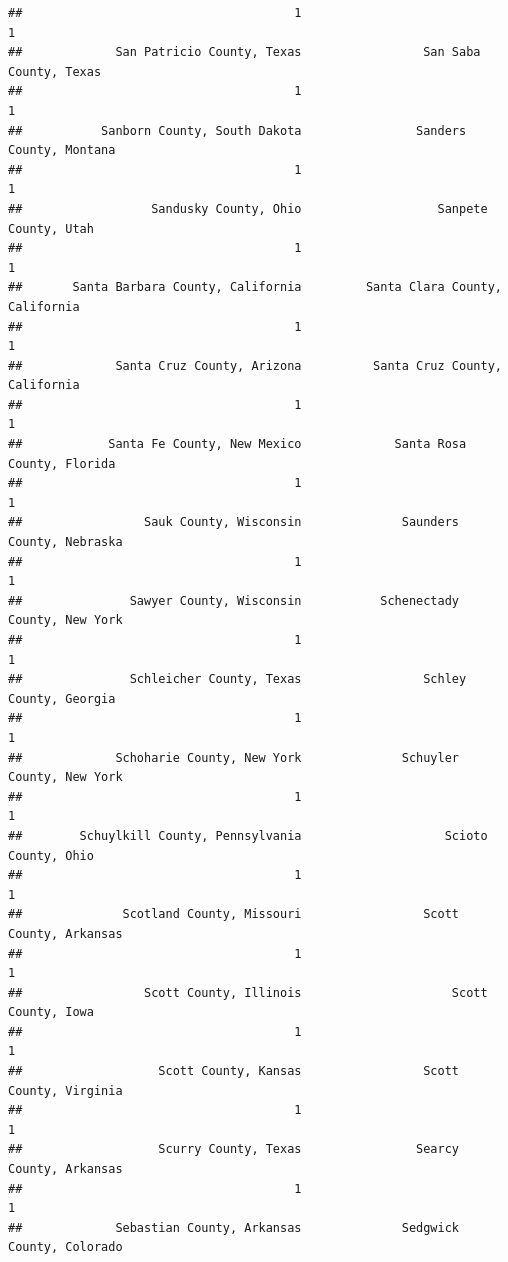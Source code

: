 \documentclass[
]{article}
\begin{document}
\begin{verbatim}
##                                      1                                      1 
##             San Patricio County, Texas                 San Saba County, Texas 
##                                      1                                      1 
##           Sanborn County, South Dakota                Sanders County, Montana 
##                                      1                                      1 
##                  Sandusky County, Ohio                   Sanpete County, Utah 
##                                      1                                      1 
##       Santa Barbara County, California         Santa Clara County, California 
##                                      1                                      1 
##             Santa Cruz County, Arizona          Santa Cruz County, California 
##                                      1                                      1 
##            Santa Fe County, New Mexico             Santa Rosa County, Florida 
##                                      1                                      1 
##                 Sauk County, Wisconsin              Saunders County, Nebraska 
##                                      1                                      1 
##               Sawyer County, Wisconsin           Schenectady County, New York 
##                                      1                                      1 
##               Schleicher County, Texas                 Schley County, Georgia 
##                                      1                                      1 
##             Schoharie County, New York              Schuyler County, New York 
##                                      1                                      1 
##        Schuylkill County, Pennsylvania                    Scioto County, Ohio 
##                                      1                                      1 
##              Scotland County, Missouri                 Scott County, Arkansas 
##                                      1                                      1 
##                 Scott County, Illinois                     Scott County, Iowa 
##                                      1                                      1 
##                   Scott County, Kansas                 Scott County, Virginia 
##                                      1                                      1 
##                   Scurry County, Texas                Searcy County, Arkansas 
##                                      1                                      1 
##             Sebastian County, Arkansas              Sedgwick County, Colorado 

\end{verbatim}
\end{document}
